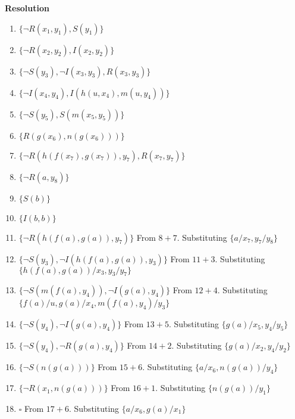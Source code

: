 \documentclass{article}
\begin{document}
	\begin{answer}
		\textbf{Resolution} 
		
		\begin{enumerate}
		  \item $\{ \neg R(x_1,y_1), S(y_1) \}$
		  \item $\{ \neg R(x_2,y_2), I(x_2,y_2) \}$
		  \item $\{ \neg S(y_3), \neg I(x_3,y_3), R(x_3,y_3) \}$
		  \item $\{ \neg I(x_4,y_4), I(h(u,x_4),m(u,y_4)) \}$
		  \item $\{ \neg S(y_5),  S(m(x_5,y_5)) \}$
		  \item $\{ R(g(x_6),n(g(x_6))) \}$
		  \item $\{ \neg R(h(f(x_7),g(x_7)),y_7), R(x_7,y_7) \}$
		  \item $\{ \neg R(a,y_8) \}$
		  \item $\{ S(b) \}$
		  \item $\{ I(b,b) \}$
		  \item $\{ \neg R(h(f(a), g(a)), y_7) \}$ From $8 + 7$. Substituting
		  $\{a/x_7, y_7/y_8\}$
		  \item $\{ \neg S(y_3), \neg I(h(f(a), g(a)), y_3)\}$ From $11 + 3$.
		  Substituting $\{h(f(a),g(a))/x_3, y_3/y_7\}$
		  \item $\{ \neg S(m(f(a), y_4)), \neg I(g(a), y_4)\}$ From $12 + 4$.
		  Substituting $\{f(a)/u, g(a)/x_4, m(f(a),y_4)/y_3\}$
		  \item $\{ \neg S(y_4), \neg I(g(a), y_4)\}$ From $13 + 5$. Substituting
		  $\{g(a)/x_5, y_4/y_5\}$
		  \item $\{ \neg S(y_4), \neg R(g(a), y_4)\}$ From $14 + 2$. Substituting $\{
		  g(a)/x_2, y_4/y_2\}$
		  \item $\{ \neg S(n(g(a)))\}$ From $15 + 6$. Substituting $\{a/x_6,
		  n(g(a))/y_4\}$
		  \item $\{ \neg R(x_1, n(g(a)))\}$ From $16 + 1$. Substituting $\{
		  n(g(a))/y_1\}$
		  \item $\square$ From $17 + 6$. Substituting $\{a/x_6, g(a)/x_1\}$
		 \end{enumerate}
	\end{answer}
\end{document}
